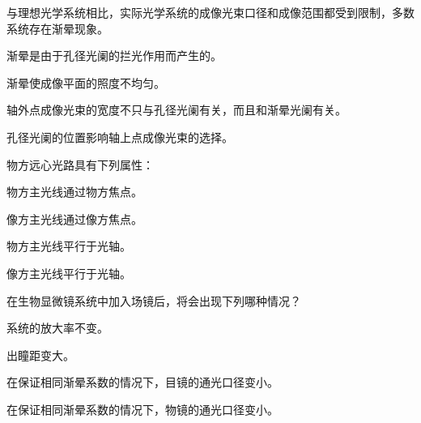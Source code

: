 \documentclass[padl, analysis, notocnum]{ExBook}
\newcommand{\answerarea}[1][3.5cm]{%
  \par\vspace{1mm}%
  \noindent{\color{themeColor!35}\rule{\linewidth}{0.4pt}}\par
  \noindent\begin{minipage}[t][#1][t]{\linewidth}\vspace{0pt}\end{minipage}\par
  \noindent{\color{themeColor!35}\rule{\linewidth}{0.4pt}}\par
}
\begin{document}
\begin{qitems}[startnum=4]
\qitem 与理想光学系统相比，实际光学系统的成像光束口径和成像范围都受到限制，多数系统存在渐晕现象。
\par\noindent\hspace{2em}渐晕是由于孔径光阑的拦光作用而产生的。
\par\noindent\hspace{2em}渐晕使成像平面的照度不均匀。
\par\noindent\hspace{2em}轴外点成像光束的宽度不只与孔径光阑有关，而且和渐晕光阑有关。
\par\noindent\hspace{2em}孔径光阑的位置影响轴上点成像光束的选择。
\label{q:73:start}
\answerarea[4.0cm]
\label{q:73:end}
\end{qitems}

\begin{qitems}[startnum=5]
\qitem 物方远心光路具有下列属性：
\par\noindent\hspace{2em}物方主光线通过物方焦点。
\par\noindent\hspace{2em}像方主光线通过像方焦点。
\par\noindent\hspace{2em}物方主光线平行于光轴。
\par\noindent\hspace{2em}像方主光线平行于光轴。
\label{q:74:start}
\answerarea[4.0cm]
\label{q:74:end}
\end{qitems}

\begin{qitems}[startnum=6]
\qitem 在生物显微镜系统中加入场镜后，将会出现下列哪种情况？
\par\noindent\hspace{2em}系统的放大率不变。
\par\noindent\hspace{2em}出瞳距变大。
\par\noindent\hspace{2em}在保证相同渐晕系数的情况下，目镜的通光口径变小。
\par\noindent\hspace{2em}在保证相同渐晕系数的情况下，物镜的通光口径变小。
\label{q:75:start}
\answerarea[4.0cm]
\label{q:75:end}
\end{qitems}
\end{document}
